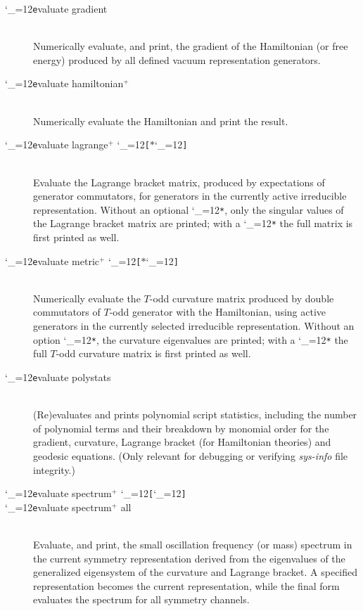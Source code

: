 \documentclass [12pt]{article}
\makeatletter
\renewcommand{\tt}{\begingroup\catcode`_=12\def\_{\string_}\tt@}
\newcommand{\tt@}[1]{\texttt{#1}\endgroup}
\makeatother
\begin{document}
\begin{description}
\item [\tt evaluate gradient]~\\
    Numerically evaluate, and print, the gradient of the Hamiltonian
    (or free energy) produced by all defined vacuum representation generators.

\item [\tt evaluate hamiltonian$^+$]~\\
    Numerically evaluate the Hamiltonian and print the result.

\item [\tt evaluate lagrange$^+$ \tt{[}$*$\tt{]}]~\\
    Evaluate the Lagrange bracket matrix,
    produced by expectations of generator commutators,
    for generators in the
    currently active irreducible representation.
    Without an optional \tt{*}, only the singular values of the Lagrange bracket
    matrix are printed;
    with a \tt{*} the full matrix is first printed as well.

\item [\tt evaluate metric$^+$ \tt{[}$*$\tt{]}]~\\
    Numerically evaluate the $T$-odd curvature matrix
    produced by double commutators of $T$-odd generator with the 
    Hamiltonian,
    using active generators in the
    currently selected irreducible representation.
    Without an option \tt{*}, the curvature eigenvalues are printed;
    with a \tt{*} the full $T$-odd curvature matrix is first printed as well.

\item [\tt evaluate polystats]~\\
    (Re)evaluates and prints polynomial script statistics,
    including the number of polynomial terms and their breakdown
    by monomial order for the gradient, curvature, Lagrange bracket
    (for Hamiltonian theories) and geodesic equations.
    (Only relevant for debugging or verifying \textit{sys-info} file integrity.)

\item [\tt evaluate spectrum$^+$ \tt{[}{\it repname}\tt{]}] \bgroup\itemsep 0pt \parskip 0pt
\item [\tt evaluate spectrum$^+$ all]~\\
    Evaluate, and print, the
    small oscillation frequency (or mass) spectrum
    in the current symmetry representation
    derived from the eigenvalues of the generalized eigensystem
    of the curvature and Lagrange bracket.
    A specified representation becomes the current representation, while
    the final form evaluates the spectrum for all symmetry channels.
\egroup


\end{description}
\end{document}
